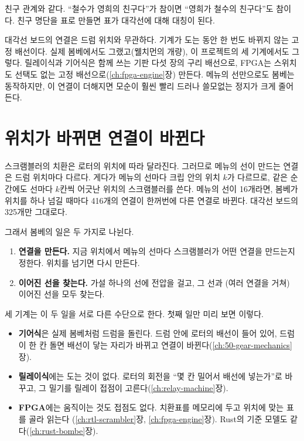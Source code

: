\General 친구 관계와 같다. ``철수가 영희의 친구다''가 참이면 ``영희가 철수의 친구다''도 참이다. 친구 명단을
표로 만들면 표가 대각선에 대해 대칭이 된다.

\Ours 대각선 보드의 연결은 드럼 위치와 무관하다. 기계가 도는 동안 한 번도 바뀌지 않는 고정 배선이다. 실제
봄베에서도 그랬고(웰치먼의 개량), 이 프로젝트의 세 기계에서도 그렇다. 릴레이식과 기어식은 함께 쓰는 기판 다섯
장의 구리 배선으로, FPGA는 스위치도 선택도 없는 고정 배선으로(\ref{ch:fpga-engine}장) 만든다. 메뉴의 선만으로도 봄베는 동작하지만, 이 연결이 더해지면 모순이 훨씬 빨리 드러나
쓸모없는 정지가 크게 줄어든다.

\section{위치가 바뀌면 연결이 바뀐다}\label{sec:c-position}

스크램블러의 치환은 로터의 위치에 따라 달라진다. 그러므로 메뉴의 선이 만드는 연결은 드럼 위치마다 다르다.
게다가 메뉴의 선마다 크립 안의 위치 $k$가 다르므로, 같은 순간에도 선마다 $k$칸씩 어긋난 위치의 스크램블러를 쓴다.
메뉴의 선이 16개라면, 봄베가 위치를 하나 넘길 때마다 416개의 연결이 한꺼번에 다른 연결로 바뀐다. 대각선 보드의
325개만 그대로다.

그래서 봄베의 일은 두 가지로 나뉜다.

\begin{keybox}[title={봄베의 두 가지 일}]
\begin{enumerate}
\item \textbf{연결을 만든다.} 지금 위치에서 메뉴의 선마다 스크램블러가 어떤 연결을 만드는지 정한다. 위치를 넘기면
다시 만든다.
\item \textbf{이어진 선을 찾는다.} 가설 하나의 선에 전압을 걸고, 그 선과 (여러 연결을 거쳐) 이어진 선을 모두 찾는다.
\end{enumerate}
\end{keybox}

세 기계는 이 두 일을 서로 다른 수단으로 한다. 첫째 일만 미리 보면 이렇다.

\begin{itemize}
\item \textbf{기어식}은 실제 봄베처럼 드럼을 돌린다. 드럼 안에 로터의 배선이 들어 있어, 드럼이 한 칸 돌면 배선이
닿는 자리가 바뀌고 연결이 바뀐다(\ref{ch:50-gear-mechanics}장).
\item \textbf{릴레이식}에는 도는 것이 없다. 로터의 회전을 ``몇 칸 밀어서 배선에 넣는가''로 바꾸고, 그 밀기를
릴레이 접점이 고른다(\ref{ch:relay-machine}장).
\item \textbf{FPGA}에는 움직이는 것도 접점도 없다. 치환표를 메모리에 두고 위치에 맞는 표를 골라 읽는다
(\ref{ch:rtl-scrambler}장, \ref{ch:fpga-engine}장). Rust의 기준 모델도 같다(\ref{ch:rust-bombe}장).
\end{itemize}

